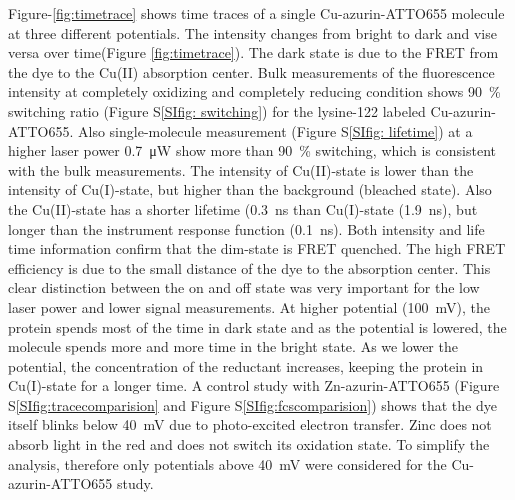 \documentclass[journal=jacsat,manuscript=article]{achemso}
\begin{document}
Figure-\ref{fig:timetrace} shows time traces of a single Cu-azurin-ATTO655 molecule at three different potentials. 
The intensity changes from bright to dark and vise versa over time(Figure \ref{fig:timetrace}).
The dark state is due to the FRET from the dye to the Cu(II) absorption center\cite{kuznetsova2006a}.
Bulk measurements of the fluorescence intensity at completely oxidizing and completely reducing condition shows \SI{90}{\percent} switching ratio (Figure S\ref{SIfig: switching}) for the lysine-122 labeled Cu-azurin-ATTO655.\cite{nicolardi2012topdown}
Also single-molecule measurement (Figure S\ref{SIfig: lifetime}) at a higher laser power \SI{0.7}{\uW} show more than \SI{90}{\percent} switching, which is consistent with the bulk measurements.
The intensity of Cu(II)-state is lower than the intensity of Cu(I)-state, but higher than the background (bleached state).
Also the Cu(II)-state has a shorter lifetime (\SI{0.3}{\ns} than Cu(I)-state (\SI{1.9}{\ns}), but longer than the instrument response function (\SI{0.1}{\ns}). 
Both intensity and life time information confirm that the dim-state is FRET quenched.
The high FRET efficiency is due to the small distance of the dye to the absorption center.
This clear distinction between the on and off state was very important for the low laser power and lower signal measurements.
At higher potential (\SI{100}{\mV}), the protein spends most of the time in dark state and as the potential is lowered, the molecule spends more and more time in the bright state.
As we lower the potential, the concentration of the reductant increases, keeping the protein in Cu(I)-state for a longer time.
A control study with Zn-azurin-ATTO655 (Figure S\ref{SIfig:tracecomparision} and Figure S\ref{SIfig:fcscomparision}) shows that the dye itself blinks below \SI{40}{\mV} due to photo-excited electron transfer.
Zinc does not absorb light in the red and does not switch its oxidation state.
To simplify the analysis, therefore only potentials above \SI{40}{\mV} were considered for the Cu-azurin-ATTO655 study.\\

\end{document}
